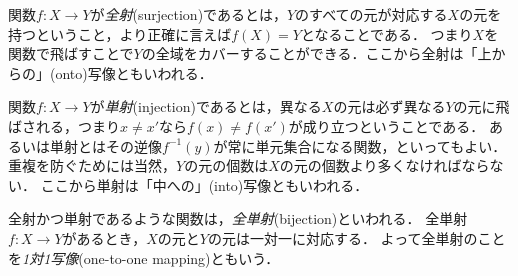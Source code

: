 \documentclass[11pt,a4paper]{bxjsarticle}
\begin{document}
関数$f:X \to Y$が\emph{全射}(surjection)であるとは，$Y$のすべての元が対応する$X$の元を持つということ，より正確に言えば$f(X)=Y$となることである．
つまり$X$を関数で飛ばすことで$Y$の全域をカバーすることができる．ここから全射は「上からの」(onto)写像ともいわれる．

関数$f:X \to Y$が\emph{単射}(injection)であるとは，異なる$X$の元は必ず異なる$Y$の元に飛ばされる，つまり$x \neq x'$なら$f(x) \neq f(x')$が成り立つということである．
あるいは単射とはその逆像$f^{-1}(y)$が常に単元集合になる関数，といってもよい．
重複を防ぐためには当然，$Y$の元の個数は$X$の元の個数より多くなければならない．
ここから単射は「中への」(into)写像ともいわれる．

全射かつ単射であるような関数は，\emph{全単射}(bijection)といわれる．
全単射$f:X \to Y$があるとき，$X$の元と$Y$の元は一対一に対応する．
よって全単射のことを\emph{1対1写像}(one-to-one mapping)ともいう．
\end{document}
